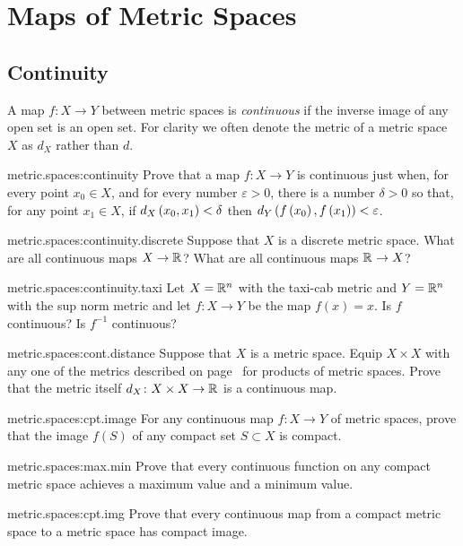 \chapter{Maps of Metric Spaces}\label{chapter:maps.of.metric.spaces}
\section{Continuity}
A map \(f \colon X \to Y\) between metric spaces is \emph{continuous} if the inverse image of any open set is an open set.
For clarity we often denote the metric of a metric space \(X\) as \(d_X\) rather than \(d\).
\begin{problem}{metric.spaces:continuity}
Prove that a map \(f \colon X \to Y\) is continuous just when, for every point \(x_0 \in X\), and for every number \(\varepsilon > 0\), there is a number \(\delta > 0\) so that, for any point \(x_1 \in X\), if \(d_X\left(x_0,x_1\right)<\delta\) then \(d_Y\left(f\left(x_0\right),f\left(x_1\right)\right)<\varepsilon\).
\end{problem}
\begin{problem}{metric.spaces:continuity.discrete}
Suppose that \(X\) is a discrete metric space.
What are all continuous maps \(X \to \mathbb{R}^{}\)?
What are all continuous maps \(\mathbb{R}^{} \to X\)?
\end{problem}
\begin{problem}{metric.spaces:continuity.taxi}
Let \(X=\mathbb{R}^{n}\) with the taxi-cab metric and \(Y=\mathbb{R}^{n}\) with the sup norm metric and let \(f \colon X \to Y\) be the map \(f(x)=x\).
Is \(f\) continuous?
Is \(f^{-1}\) continuous?
\end{problem}
\begin{problem}{metric.spaces:cont.distance}
Suppose that \(X\) is a metric space.
Equip \(X \times X\) with any one of the metrics described on page~\pageref{item:product.metrics} for products of metric spaces.
Prove that the metric itself \(d_X \colon X \times X \to \mathbb{R}^{}\) is a continuous map.
\end{problem}
\begin{problem}{metric.spaces:cpt.image}
For any continuous map \(f \colon X \to Y\) of metric spaces, prove that the image \(f(S)\) of any compact set \(S \subset X\) is compact.
\end{problem}
\begin{problem}{metric.spaces:max.min}
Prove that every continuous function on any compact metric space achieves a maximum value and a minimum value.
\end{problem}
\begin{problem}{metric.spaces:cpt.img}
Prove that every continuous map from a compact metric space to a metric space has compact image.
\end{problem}

